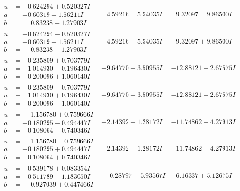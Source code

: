 \documentclass[1p]{elsarticle_modified}
\theoremstyle{definition}
\begin{document}
$$\begin{array}{c|c|c}
\begin{aligned}
u &= -0.624294 + 0.520327 I \\
a &= -0.60319 + 1.66211 I \\
b &= \phantom{-}0.83238 + 1.27903 I\end{aligned}
 & -4.59216 + 5.54035 I & -9.32097 - 9.86500 I \\ \hline\begin{aligned}
u &= -0.624294 - 0.520327 I \\
a &= -0.60319 - 1.66211 I \\
b &= \phantom{-}0.83238 - 1.27903 I\end{aligned}
 & -4.59216 - 5.54035 I & -9.32097 + 9.86500 I \\ \hline\begin{aligned}
u &= -0.235809 + 0.703779 I \\
a &= -1.014930 - 0.196430 I \\
b &= -0.200096 + 1.060140 I\end{aligned}
 & -9.64770 + 3.50955 I & -12.88121 - 2.67575 I \\ \hline\begin{aligned}
u &= -0.235809 - 0.703779 I \\
a &= -1.014930 + 0.196430 I \\
b &= -0.200096 - 1.060140 I\end{aligned}
 & -9.64770 - 3.50955 I & -12.88121 + 2.67575 I \\ \hline\begin{aligned}
u &= \phantom{-}1.156780 + 0.759666 I \\
a &= -0.180295 - 0.494447 I \\
b &= -0.108064 - 0.740346 I\end{aligned}
 & -2.14392 - 1.28172 I & -11.74862 + 4.27913 I \\ \hline\begin{aligned}
u &= \phantom{-}1.156780 - 0.759666 I \\
a &= -0.180295 + 0.494447 I \\
b &= -0.108064 + 0.740346 I\end{aligned}
 & -2.14392 + 1.28172 I & -11.74862 - 4.27913 I \\ \hline\begin{aligned}
u &= -0.539178 + 0.083354 I \\
a &= -0.511789 - 1.183050 I \\
b &= \phantom{-}0.927039 + 0.447466 I\end{aligned}
 & \phantom{-}0.28797 - 5.93567 I & -6.16337 + 5.12675 I \\ \hline\begin{aligned}

\end{aligned}
\end{array}$$
\end{document}
